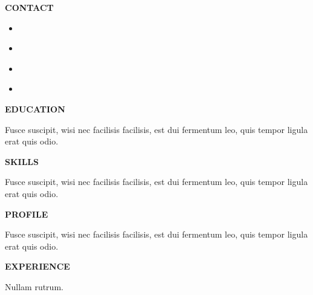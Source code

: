 \documentclass{article}
\renewcommand{\section}[2][L]{
  \ifthenelse{\equal{#1}{L}}{\RaggedLeft}{\RaggedRight}
  \normalfont\Large\bfseries
  {#2}
  \vspace{-10pt}\newline{\hrulefill}\normalfont\newline
}
\begin{document}
    \begin{minipage}[c]{\linewidth}
      \RaggedLeft{\myName}\newline
      \RaggedLeft{\myTagline}
    \end{minipage}
    \vspace{2cm}

    \begin{minipage}[c]{0.3\linewidth}
      \section[L]{CONTACT}
      \begin{itemize}[label=,topsep=8pt,itemsep=4pt,partopsep=4pt, parsep=4pt]
              \RaggedLeft
              \small
        \item\href{mailto:\myEmail}{\myEmail\hspace{10pt}\faEnvelope}
        \item\href{https://\myWeb}{\myWeb\hspace{10pt}\faHome}
        \item\href{https://www.linkedin.com/in/\myLinkedin}{\myLinkedin\hspace{10pt}\faLinkedin}
        \item\href{https://\myWeb}{\myGithub\hspace{10pt}\faGithub}
      \end{itemize}

      \section[L]{EDUCATION}
      Fusce suscipit, wisi nec facilisis facilisis, est dui fermentum leo, quis tempor ligula erat quis odio.

      \section[L]{SKILLS}
      Fusce suscipit, wisi nec facilisis facilisis, est dui fermentum leo, quis tempor ligula erat quis odio.

    \end{minipage}
    \hspace{0.5cm}
    \vrule
    \hspace{0.5cm}
    \begin{minipage}[c]{0.6\linewidth}
      \section[R]{PROFILE}
      Fusce suscipit, wisi nec facilisis facilisis, est dui fermentum leo, quis tempor ligula erat quis odio.

      \section[R]{EXPERIENCE}
      Nullam rutrum.
    \end{minipage}
\end{document}
